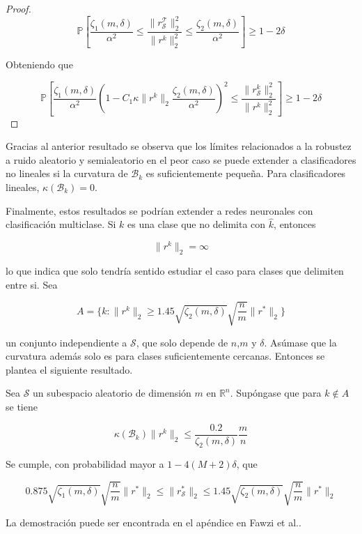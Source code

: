 \begin{proof}
$$\mathbb{P} \left[ \frac{\zeta_1 (m,\delta)}{\alpha^2} \leq \frac{\|r_\mathcal{S}^\mathcal{T} \|_2^2}{\|r^k \|_2^2} \leq \frac{\zeta_2 (m,\delta)}{\alpha^2} \right] \geq 1 - 2\delta$$

Obteniendo que

$$\mathbb{P} \left[ \frac{\zeta_1 (m,\delta)}{\alpha^2} \left( 1 - C_1 \kappa \|r^k \|_2 \frac{\zeta_2 (m,\delta)}{\alpha^2} \right)^2 \leq \frac{\|r_\mathcal{S}^k \|_2^2}{\|r^k \|_2^2} \right] \geq 1 - 2\delta$$

\end{proof}

Gracias al anterior resultado se observa que los límites relacionados a la robustez a ruido aleatorio y semialeatorio en el peor caso se puede extender a clasificadores no lineales si la curvatura de $\mathcal{B}_k$ es suficientemente pequeña. Para clasificadores lineales, $\kappa (\mathcal{B}_k)=0$.

Finalmente, estos resultados se podrían extender a redes neuronales con clasificación multiclase. Si $k$ es una clase que no delimita con $\widehat{k}$, entonces 

$$\|r^k \|_2 = \infty$$

lo que indica que solo tendría sentido estudiar el caso para clases que delimiten entre si. Sea

$$A = \{k : \|r^k \|_2 \geq 1.45 \sqrt{\zeta_2 (m,\delta)} \sqrt{\frac{n}{m}} \|r^* \|_2\}$$

un conjunto independiente a $\mathcal{S}$, que solo depende de $n$,$m$ y $\delta$. Asúmase que la curvatura además solo es para clases suficientemente cercanas. Entonces se plantea el siguiente resultado.

\begin{proposicion}
Sea $\mathcal{S}$ un subespacio aleatorio de dimensión $m$ en $\mathbb{R}^n$. Supóngase que para $k \notin A$ se tiene

$$\kappa (\mathcal{B}_k) \|r^k \|_2 \leq \frac{0.2}{\zeta_2 (m,\delta)} \frac{m}{n}$$

Se cumple, con probabilidad mayor a $1-4(M+2)\delta$, que

$$0.875 \sqrt{\zeta_1 (m,\delta)} \sqrt{\frac{n}{m}} \| r^* \|_2 \leq \|r_\mathcal{S}^* \|_2 \leq 1.45 \sqrt{\zeta_2 (m,\delta)} \sqrt{\frac{n}{m}} \|r^* \|_2$$
\end{proposicion}

La demostración puede ser encontrada en el apéndice en Fawzi et al.\cite{CURVATURE}.


